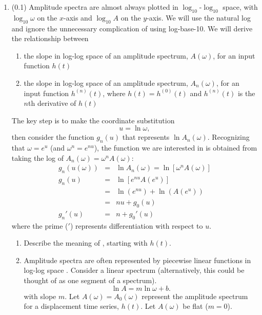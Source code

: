 \documentclass[11pt,titlepage,fleqn]{article}
\newcommand{\fft}{h}
\begin{document}
\begin{enumerate}
\item (0.1) Amplitude spectra are almost always plotted in $\log_{10}$-$\log_{10}$ space, with $\log_{10}\omega$ on the $x$-axis and $\log_{10}A$ on the $y$-axis. We will use the natural log and ignore the unnecessary complication of using log-base-10. We will derive the relationship between
%
\begin{enumerate}
\item the slope in log-log space of an amplitude spectrum, $A(\omega)$, for an input function $\fft(t)$
\item the slope in log-log space of an amplitude spectrum, $A_n(\omega)$, for an input function $h^{(n)}(t)$, where $h(t) = h^{(0)}(t)$ and $h^{(n)}(t)$ is the $n$th derivative of $h(t)$
\end{enumerate}

The key step is to make the coordinate substitution
%
\begin{equation}
u = \ln\omega,
\end{equation}
%
then consider the function $g_n(u)$ that represents $\ln A_n(\omega)$. Recognizing that $\omega = e^u$ (and $\omega^n = e^{nu}$), the function we are interested in is obtained from taking the log of \mbox{$A_n(\omega) = \omega^n A(\omega)$}:
%
\begin{eqnarray}
g_n(u(\omega)) &=& \ln A_n(\omega) = \ln[ \omega^n A(\omega)]
\\
g_n(u) &=& \ln[ e^{nu} A(e^u) ]
\\
&=& \ln(e^{nu}) + \ln(A(e^u))
\\
&=& nu + g_0(u)
\\
g_n'(u) &=& n + g_0'(u)
\label{Anslope}
\end{eqnarray}
%
where the prime ($'$) represents differentiation with respect to $u$.

\begin{enumerate}
\item Describe the meaning of , starting with $\fft(t)$.

\item Amplitude spectra are often represented by piecewise linear functions in log-log space \citep[\eg][Figs.~6.3-6 and 6.6-8]{SteinWysession}. Consider a linear spectrum (alternatively, this could be thought of as one segment of a spectrum).
%
\begin{equation}
\ln A = m \ln\omega + b.
\label{Alin}
\end{equation}
%
with slope $m$.
Let $A(\omega) = A_0(\omega)$ represent the amplitude spectrum for a displacement time series, $\fft(t)$. Let $A(\omega)$ be flat ($m=0$).


\end{enumerate}
\end{enumerate}
\end{document}
